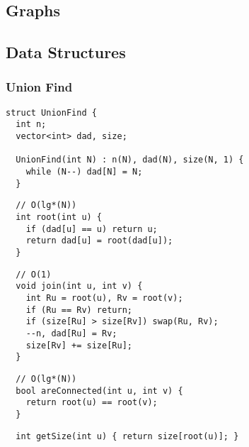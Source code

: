 \documentclass[twoside]{article}
\newcommand{\fileTitleStyle}{\raggedleft\underline}
\begin{document}
\begin{multicols*}{2}
    \tableofcontents
\end{multicols*}
\begin{multicols*}{2}
\newpage
\vspace{1em}
\section*{Graphs}
\vspace{3em}
\vspace{0em}
\subsection*{Data Structures}
\vspace{2em}
\subsubsectionfont{\fileTitleStyle}
\subsubsection*{Union Find}
\begin{verbatim}
struct UnionFind {
  int n;
  vector<int> dad, size;

  UnionFind(int N) : n(N), dad(N), size(N, 1) {
    while (N--) dad[N] = N;
  }
\end{verbatim}
\vspace{-12pt}
\begin{verbatim}
  // O(lg*(N))
  int root(int u) {
    if (dad[u] == u) return u;
    return dad[u] = root(dad[u]);
  }
\end{verbatim}
\vspace{-12pt}
\begin{verbatim}
  // O(1)
  void join(int u, int v) {
    int Ru = root(u), Rv = root(v);
    if (Ru == Rv) return;
    if (size[Ru] > size[Rv]) swap(Ru, Rv);
    --n, dad[Ru] = Rv;
    size[Rv] += size[Ru];
  }
\end{verbatim}
\vspace{-12pt}
\begin{verbatim}
  // O(lg*(N))
  bool areConnected(int u, int v) {
    return root(u) == root(v);
  }
\end{verbatim}
\vspace{-12pt}
\begin{verbatim}
  int getSize(int u) { return size[root(u)]; }


\end{verbatim}
\end{multicols*}
\end{document}
